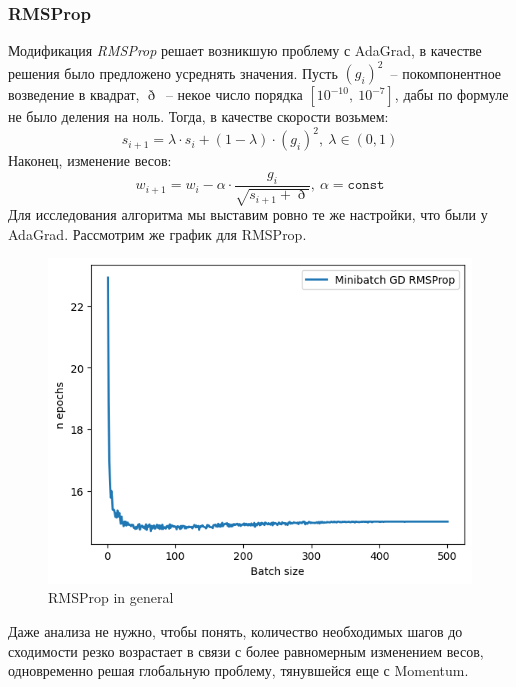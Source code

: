 \documentclass[12pt, a4paper, oneside, final]{article}
\begin{document}
	\subsubsection*{RMSProp}
	Модификация \textit{RMSProp} решает возникшую проблему с AdaGrad, в качестве решения было предложено усреднять значения.
	Пусть $(g_{i})^{2}$~-- покомпонентное возведение в квадрат, $\eth$~-- некое число порядка $[10^{-10}, ~ 10^{-7}]$, дабы по формуле не было деления на ноль.
	Тогда, в качестве скорости возьмем:
	\[
		s_{i + 1} = \lambda \cdot s_{i} + (1 - \lambda) \cdot (g_{i})^{2}, ~ \lambda \in (0, 1)
	\]
	Наконец, изменение весов:
	\[
		w_{i + 1} = w_{i} - \alpha \cdot \dfrac{g_{i}}{\sqrt{s_{i + 1} + \eth}}, ~ \alpha = \mathtt{const}
	\]
	Для исследования алгоритма мы выставим ровно те же настройки, что были у AdaGrad.
	Рассмотрим же график для RMSProp.
	\begin{figure}[H]
		\centering
		\includegraphics[scale = 0.9]{Image/T3_RMSPROP_GENERAL.png}
		\caption*{RMSProp in general}
	\end{figure}
	Даже анализа не нужно, чтобы понять, количество необходимых шагов до сходимости резко возрастает в связи с более равномерным изменением весов, одновременно решая глобальную проблему, тянувшейся еще с Momentum.
\end{document}
